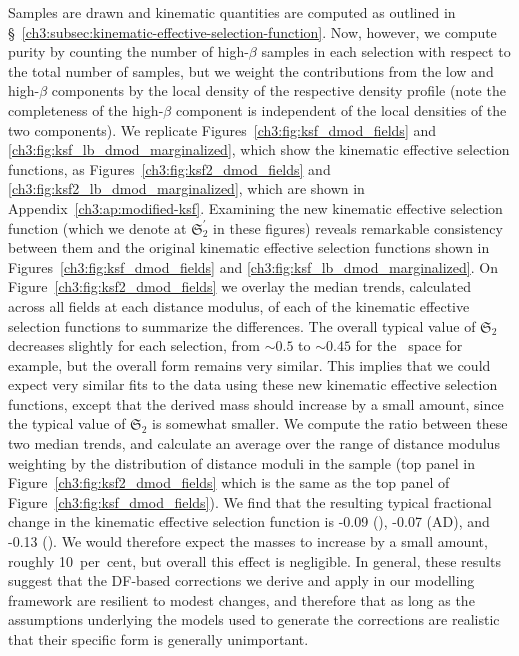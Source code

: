 Samples are drawn and kinematic quantities are computed as outlined in \S~\ref{ch3:subsec:kinematic-effective-selection-function}. Now, however, we compute purity by counting the number of high-$\beta$ samples in each selection with respect to the total number of samples, but we weight the contributions from the low and high-$\beta$ components by the local density of the respective density profile (note the completeness of the high-$\beta$ component is independent of the local densities of the two components). We replicate Figures~\ref{ch3:fig:ksf_dmod_fields} and \ref{ch3:fig:ksf_lb_dmod_marginalized}, which show the kinematic effective selection functions, as Figures~\ref{ch3:fig:ksf2_dmod_fields} and \ref{ch3:fig:ksf2_lb_dmod_marginalized}, which are shown in Appendix~\ref{ch3:ap:modified-ksf}. Examining the new kinematic effective selection function (which we denote at $\mathfrak{S}_{2}^{\prime}$ in these figures) reveals remarkable consistency between them and the original kinematic effective selection functions shown in Figures~\ref{ch3:fig:ksf_dmod_fields} and \ref{ch3:fig:ksf_lb_dmod_marginalized}. On Figure~\ref{ch3:fig:ksf2_dmod_fields} we overlay the median trends, calculated across all fields at each distance modulus, of each of the kinematic effective selection functions to summarize the differences. The overall typical value of $\mathfrak{S}_{2}$ decreases slightly for each selection, from $\sim 0.5$ to $\sim 0.45$ for the \eLz\ space for example, but the overall form remains very similar. This implies that we could expect very similar fits to the data using these new kinematic effective selection functions, except that the derived mass should increase by a small amount, since the typical value of $\mathfrak{S}_{2}$ is somewhat smaller. We compute the ratio between these two median trends, and calculate an average over the range of distance modulus weighting by the distribution of distance moduli in the sample (top panel in Figure~\ref{ch3:fig:ksf2_dmod_fields} which is the same as the top panel of Figure~\ref{ch3:fig:ksf_dmod_fields}). We find that the resulting typical fractional change in the kinematic effective selection function is -0.09 (\eLz), -0.07 (AD), and -0.13 (\JRLz). We would therefore expect the masses to increase by a small amount, roughly 10~per~cent, but overall this effect is negligible. In general, these results suggest that the DF-based corrections we derive and apply in our modelling framework are resilient to modest changes, and therefore that as long as the assumptions underlying the models used to generate the corrections are realistic that their specific form is generally unimportant.

